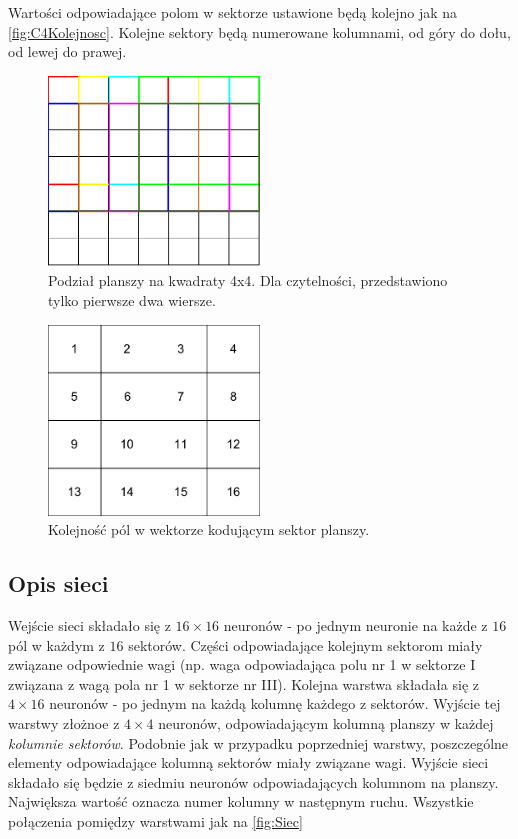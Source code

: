 \documentclass{llncs}
\begin{document}
Wartości odpowiadające polom w sektorze ustawione będą kolejno jak na \autoref{fig:C4Kolejnosc}. Kolejne sektory będą numerowane kolumnami, od góry do dołu, od lewej do prawej.

\begin{figure}[H]
	\centering	
	\includegraphics[width=0.5\textwidth]{img/ConnectFour4x4.pdf}
	\caption{Podział planszy na kwadraty 4x4. Dla czytelności, przedstawiono tylko pierwsze dwa wiersze.}
	\label{fig:C4Podzial}
\end{figure}

\begin{figure}[H]
	\centering	
	\includegraphics[width=0.5\textwidth]{img/ConnectFourOrder.pdf}	\caption{Kolejność pól w wektorze kodującym sektor planszy.}
	\label{fig:C4Kolejnosc}
\end{figure}

\subsection{Opis sieci}
Wejście sieci składało się z $16 \times 16$ neuronów - po jednym neuronie na każde z $16$ pól w każdym z $16$ sektorów. Części odpowiadające kolejnym sektorom miały związane odpowiednie wagi (np. waga odpowiadająca polu nr 1 w sektorze I związana z wagą pola nr 1 w sektorze nr III). Kolejna warstwa składała się z $4 \times 16$ neuronów - po jednym na każdą kolumnę każdego z sektorów.
Wyjście tej warstwy złożnoe z $4 \times 4$ neuronów, odpowiadającym kolumną planszy w każdej \emph{kolumnie sektorów}. Podobnie jak w przypadku 
poprzedniej warstwy, poszczególne elementy odpowiadające kolumną sektorów miały związane wagi.
Wyjście sieci składało się będzie z siedmiu neuronów odpowiadających kolumnom na planszy. Największa wartość oznacza numer kolumny w następnym ruchu.
Wszystkie połączenia pomiędzy warstwami jak na \autoref{fig:Siec}
\end{document}
